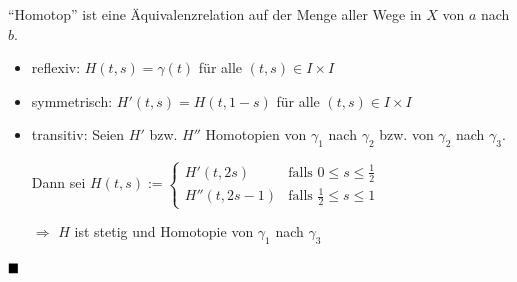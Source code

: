 \begin{bemerkung}
    \enquote{Homotop} ist eine Äquivalenzrelation auf der Menge aller
    Wege in $X$ von $a$ nach $b$.
\end{bemerkung}

\begin{beweis}\leavevmode
    \begin{itemize}
        \item reflexiv: $H(t,s) = \gamma(t)$ für alle $(t,s) \in I \times I$
        \item symmetrisch: $H'(t,s) = H(t,1-s)$ für alle $(t,s) \in I \times I$
        \item transitiv: Seien $H'$ bzw. $H''$ Homotopien von $\gamma_1$
              nach $\gamma_2$ bzw. von $\gamma_2$ nach $\gamma_3$.

              Dann sei $H(t,s) := \begin{cases}
              H'(t, 2s)    &\text{falls } 0 \leq s \leq \frac{1}{2}\\
              H''(t, 2s-1) &\text{falls } \frac{1}{2} \leq s \leq 1\end{cases}$

              $\Rightarrow$ $H$ ist stetig und Homotopie von $\gamma_1$ nach 
              $\gamma_3$
    \end{itemize}
    $\qed$
\end{beweis}

